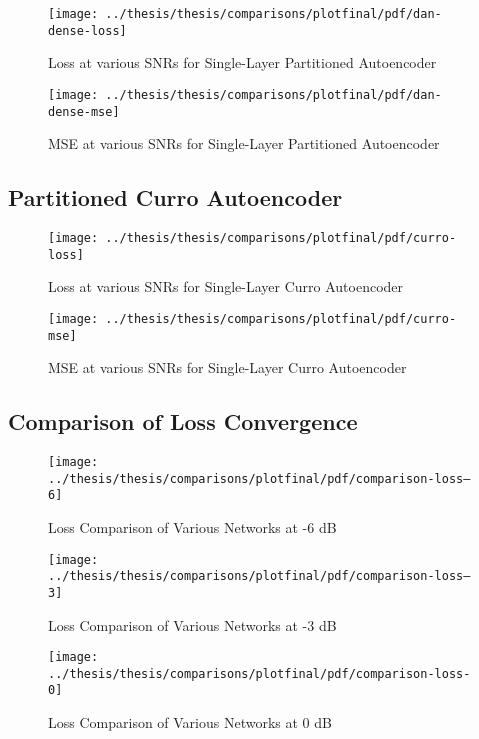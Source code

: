 \begin{figure}[!ht]
\centering
\texttt{[image: ../thesis/thesis/comparisons/plotfinal/pdf/dan-dense-loss]}
\caption{Loss at various SNRs for Single-Layer Partitioned Autoencoder\cite{stow}}
\end{figure}

\begin{figure}[!ht]
\centering
\texttt{[image: ../thesis/thesis/comparisons/plotfinal/pdf/dan-dense-mse]}
\caption{MSE at various SNRs for Single-Layer Partitioned Autoencoder\cite{stow}}
\end{figure}

\subsection{Partitioned Curro Autoencoder}

\begin{figure}[!ht]
\centering
\texttt{[image: ../thesis/thesis/comparisons/plotfinal/pdf/curro-loss]}
\caption{Loss at various SNRs for Single-Layer Curro Autoencoder}
\end{figure}

\begin{figure}[!ht]
\centering
\texttt{[image: ../thesis/thesis/comparisons/plotfinal/pdf/curro-mse]}
\caption{MSE at various SNRs for Single-Layer Curro Autoencoder}
\end{figure}

\subsection{Comparison of Loss Convergence}

\begin{figure}[!ht]
\centering
\texttt{[image: ../thesis/thesis/comparisons/plotfinal/pdf/comparison-loss--6]}
\caption{Loss Comparison of Various Networks at -6 dB}
\end{figure}

\begin{figure}[!ht]
\centering
\texttt{[image: ../thesis/thesis/comparisons/plotfinal/pdf/comparison-loss--3]}
\caption{Loss Comparison of Various Networks at -3 dB}
\end{figure}

\begin{figure}[!ht]
\centering
\texttt{[image: ../thesis/thesis/comparisons/plotfinal/pdf/comparison-loss-0]}
\caption{Loss Comparison of Various Networks at 0 dB}
\end{figure}

